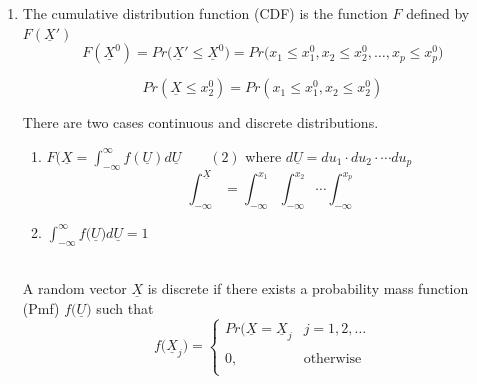 \documentclass[11pt,a4paper]{article}
\theoremstyle{definition}
\begin{document}
\begin{enumerate}
\item The cumulative distribution function (CDF) is the function $F$ defined by $F(\underline{X}')$
\begin{equation}\tag{1}
F(\underline{X}^0)=Pr\big(\underline{X}'\leq \underline{X}^0\big) = Pr\big(x_1\leq x_1^0, x_2\leq x_2^0, \ldots, x_p\leq x_p^0\big)
\end{equation} 


\begin{figure}[H]
\centering
{}
\end{figure}




$$Pr(\underline{X}\leq x_2^0) = Pr(x_1\leq x_1^0, x_2\leq x^0_2)$$














There are two cases continuous and discrete distributions.
\begin{enumerate}
\item $\displaystyle{F(\underline{X} = \int^{\infty}_{-\infty}f(\underline{U})d\underline{U}}\qquad (2)$ where $d\underline{U}=du_1\cdot du_2\cdot\cdots du_p$
$$\int^{\underline{X}}_{-\infty} = \int^{x_1}_{-\infty}\int^{x_2}_{-\infty}\cdots\int^{x_p}_{-\infty}$$

\item $\displaystyle{\int^{\infty}_{-\infty}f\big(\underline{U}\big)d\underline{U}=1}$\\\\
\end{enumerate}





A random vector $\underline{X}$ is discrete if there exists a probability mass function (Pmf) $f\big(\underline{U}\big)$ such that 
\[f\big(\underline{X}_j\big) =
\begin{cases}
Pr\big(\underline{X}=\underline{X}_j & j=1,2,\ldots\\\\
0, & \text{otherwise}\\
\end{cases}
\]\\
\end{enumerate}
\end{document}
